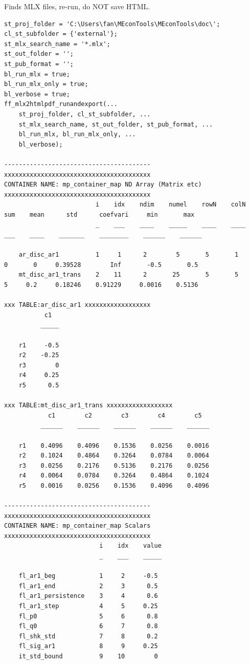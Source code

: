 \documentclass[
]{book}
\begin{document}
Finds MLX files, re-run, do NOT save HTML.

\begin{verbatim}
st_proj_folder = 'C:\Users\fan\MEconTools\MEconTools\doc\';
cl_st_subfolder = {'external'};
st_mlx_search_name = '*.mlx';
st_out_folder = '';
st_pub_format = '';
bl_run_mlx = true;
bl_run_mlx_only = true;
bl_verbose = true;
ff_mlx2htmlpdf_runandexport(...
    st_proj_folder, cl_st_subfolder, ...
    st_mlx_search_name, st_out_folder, st_pub_format, ...
    bl_run_mlx, bl_run_mlx_only, ...
    bl_verbose);

----------------------------------------
xxxxxxxxxxxxxxxxxxxxxxxxxxxxxxxxxxxxxxxx
CONTAINER NAME: mp_container_map ND Array (Matrix etc)
xxxxxxxxxxxxxxxxxxxxxxxxxxxxxxxxxxxxxxxx
                         i    idx    ndim    numel    rowN    colN    sum    mean      std      coefvari     min       max  
                         _    ___    ____    _____    ____    ____    ___    ____    _______    ________    ______    ______

    ar_disc_ar1          1     1      2        5       5       1       0       0     0.39528        Inf       -0.5       0.5
    mt_disc_ar1_trans    2    11      2       25       5       5       5     0.2     0.18246    0.91229     0.0016    0.5136

xxx TABLE:ar_disc_ar1 xxxxxxxxxxxxxxxxxx
           c1  
          _____

    r1     -0.5
    r2    -0.25
    r3        0
    r4     0.25
    r5      0.5

xxx TABLE:mt_disc_ar1_trans xxxxxxxxxxxxxxxxxx
            c1        c2        c3        c4        c5  
          ______    ______    ______    ______    ______

    r1    0.4096    0.4096    0.1536    0.0256    0.0016
    r2    0.1024    0.4864    0.3264    0.0784    0.0064
    r3    0.0256    0.2176    0.5136    0.2176    0.0256
    r4    0.0064    0.0784    0.3264    0.4864    0.1024
    r5    0.0016    0.0256    0.1536    0.4096    0.4096

----------------------------------------
xxxxxxxxxxxxxxxxxxxxxxxxxxxxxxxxxxxxxxxx
CONTAINER NAME: mp_container_map Scalars
xxxxxxxxxxxxxxxxxxxxxxxxxxxxxxxxxxxxxxxx
                          i    idx    value
                          _    ___    _____

    fl_ar1_beg            1     2     -0.5 
    fl_ar1_end            2     3      0.5 
    fl_ar1_persistence    3     4      0.6 
    fl_ar1_step           4     5     0.25 
    fl_p0                 5     6      0.8 
    fl_q0                 6     7      0.8 
    fl_shk_std            7     8      0.2 
    fl_sig_ar1            8     9     0.25 
    it_std_bound          9    10        0 


\end{verbatim}
\end{document}

